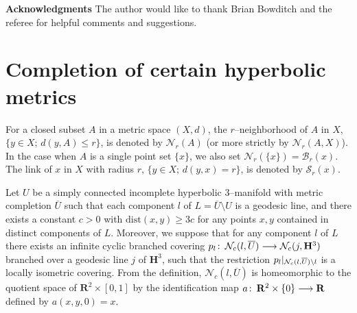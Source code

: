 \documentclass{gtart_a}
\theoremstyle{definition}
\numberwithin{equation}{section}
\begin{document}
\textbf{Acknowledgments}\qua
The author would like to thank Brian Bowditch and the referee for helpful comments and suggestions.



\section{Completion of certain hyperbolic metrics}\label{S1}


For a closed subset $A$ in a metric space $(X,d)$, the $r$--neighborhood of $A$ in $X$, $\{y\in X;\, d(y,A)\leq r\}$, 
is denoted by $\mathcal{N}_r(A)$ (or more strictly by $\mathcal{N}_r(A,X)$).
In the case when $A$ is a single point set $\{x\}$, we also set $\mathcal{N}_r(\{x\})=\mathcal{B}_r(x)$.
The link of $x$ in $X$ with radius $r$, $\{y\in X;\, d(y,x)= r\}$, is denoted by $\mathcal{S}_r(x)$.




Let $U$ be a simply connected incomplete hyperbolic $3$--manifold with metric completion $\overline U$ such that each 
component $l$ of $L=\overline U\setminus U$ 
is a geodesic line, and there exists a constant $c>0$ with $\mathrm{dist} (x,y)\geq 3c$ for any points $x,y$ 
contained in distinct components of $L$.
Moreover, we suppose that for any component $l$ of $L$ there exists an infinite cyclic branched covering 
$p_l\mskip0.5mu\colon\thinspace \mathcal{N}_c(l,\overline U)\longrightarrow \mathcal{N}_c(j,\mathbf{H}^3)$
branched over a geodesic line $j$ of $\mathbf{H}^3$, such that the restriction 
$p_l|_{\smash{\mathcal{N}_c(l, \overline U)\setminus l}}$ is a locally isometric covering.
From the definition, $\mathcal{N}_c (l,\overline U)$ is homeomorphic to the quotient space of 
$\mathbf{R}^2\times [0,1]$ by the identification map $a\mskip0.5mu\colon\thinspace \mathbf{R}^2\times \{0\}\longrightarrow \mathbf{R}$ 
defined by $a(x,y,0)=x$.
\end{document}

